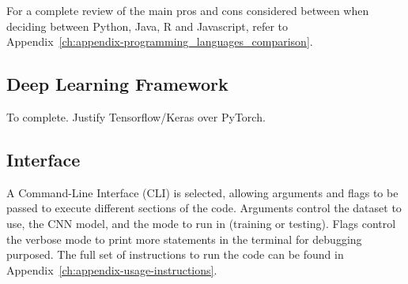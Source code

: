 For a complete review of the main pros and cons considered between when deciding between Python, Java, R and Javascript, refer to Appendix~\ref{ch:appendix-programming_languages_comparison}.

\subsection{Deep Learning Framework}

To complete. Justify Tensorflow/Keras over PyTorch.

\subsection{Interface}

A Command-Line Interface (CLI) is selected, allowing arguments and flags to be passed to execute different sections of the code. Arguments control the dataset to use, the CNN model, and the mode to run in (training or testing). Flags control the verbose mode to print more statements in the terminal for debugging purposed. The full set of instructions to run the code can be found in Appendix~\ref{ch:appendix-usage-instructions}.
